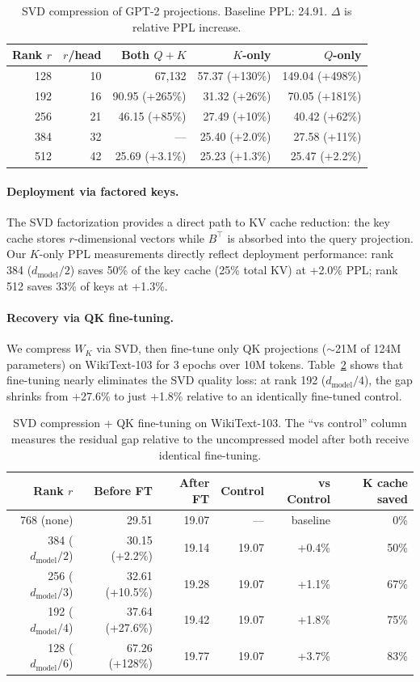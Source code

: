 \documentclass[11pt]{article}
\newcommand{\dmodel}{d_{\text{model}}}
\begin{document}
\begin{table}[h]
\centering
\caption{SVD compression of GPT-2 projections. Baseline PPL: 24.91. $\Delta$ is relative PPL increase.}
\label{tab:svd}
\begin{tabular}{rrrrr}
\toprule
Rank $r$ & $r$/head & Both $Q{+}K$ & $K$-only & $Q$-only \\
\midrule
128 & 10 & 67,132 & 57.37 (+130\%) & 149.04 (+498\%) \\
192 & 16 & 90.95 (+265\%) & 31.32 (+26\%) & 70.05 (+181\%) \\
256 & 21 & 46.15 (+85\%) & 27.49 (+10\%) & 40.42 (+62\%) \\
384 & 32 & --- & 25.40 (+2.0\%) & 27.58 (+11\%) \\
512 & 42 & 25.69 (+3.1\%) & 25.23 (+1.3\%) & 25.47 (+2.2\%) \\
\bottomrule
\end{tabular}
\end{table}

\paragraph{Deployment via factored keys.}
The SVD factorization provides a direct path to KV cache reduction: the key cache stores $r$-dimensional vectors while $B^\top$ is absorbed into the query projection. Our $K$-only PPL measurements directly reflect deployment performance: rank 384 ($\dmodel/2$) saves 50\% of the key cache (25\% total KV) at +2.0\% PPL; rank 512 saves 33\% of keys at +1.3\%.

\paragraph{Recovery via QK fine-tuning.}
We compress $W_K$ via SVD, then fine-tune only QK projections ($\sim$21M of 124M parameters) on WikiText-103 for 3 epochs over 10M tokens. Table~\ref{tab:svd_finetune} shows that fine-tuning nearly eliminates the SVD quality loss: at rank 192 ($\dmodel/4$), the gap shrinks from +27.6\% to just +1.8\% relative to an identically fine-tuned control.

\begin{table}[h]
\centering
\caption{SVD compression + QK fine-tuning on WikiText-103. The ``vs control'' column measures the residual gap relative to the uncompressed model after both receive identical fine-tuning.}
\label{tab:svd_finetune}
\begin{tabular}{rrrrrr}
\toprule
Rank $r$ & Before FT & After FT & Control & vs Control & K cache saved \\
\midrule
768 (none) & 29.51 & 19.07 & --- & baseline & 0\% \\
384 ($\dmodel/2$) & 30.15 (+2.2\%) & 19.14 & 19.07 & +0.4\% & 50\% \\
256 ($\dmodel/3$) & 32.61 (+10.5\%) & 19.28 & 19.07 & +1.1\% & 67\% \\
192 ($\dmodel/4$) & 37.64 (+27.6\%) & 19.42 & 19.07 & +1.8\% & 75\% \\
128 ($\dmodel/6$) & 67.26 (+128\%) & 19.77 & 19.07 & +3.7\% & 83\% \\
\bottomrule
\end{tabular}
\end{table}
\end{document}
